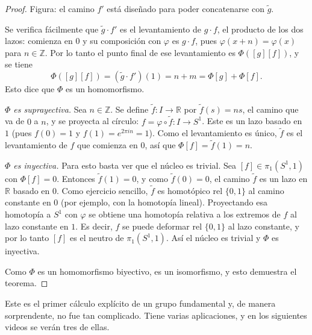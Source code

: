 \documentclass[11pt]{article}
\begin{document}
\begin{proof}
\noindent Figura: el camino $f'$ está diseñado para poder concatenarse con $\tilde g$.

\medskip
Se verifica fácilmente que $\tilde g\cdot f'$ es el levantamiento de $g\cdot f$, el producto de los dos lazos: comienza en $0$ y su composición con $\varphi$ es $g\cdot f$, pues $\varphi(x+n)=\varphi(x)$ para $n\in\mathbb{Z}$. Por lo tanto el punto final de ese levantamiento es $\Phi([g][f])$, y se tiene
\[
  \Phi([g][f])=(\tilde g\cdot f')(1)=n+m=\Phi[g]+\Phi[f].
\]
Esto dice que $\Phi$ es un homomorfismo.

\medskip\noindent\textit{$\Phi$ es suprayectiva.}
Sea $n\in\mathbb{Z}$. Se define $\tilde f\colon I\to\mathbb{R}$ por $\tilde f(s)=ns$, el camino que va de $0$ a $n$, y se proyecta al círculo: $f=\varphi\circ\tilde f\colon I\to S^1$. Este es un lazo basado en $1$ (pues $f(0)=1$ y $f(1)=e^{2\pi i n}=1$). Como el levantamiento es único, $\tilde f$ es el levantamiento de $f$ que comienza en $0$, así que $\Phi[f]=\tilde f(1)=n$.

\medskip\noindent\textit{$\Phi$ es inyectiva.}
Para esto basta ver que el núcleo es trivial. Sea $[f]\in\pi_1(S^1,1)$ con $\Phi[f]=0$. Entonces $\tilde f(1)=0$, y como $\tilde f(0)=0$, el camino $\tilde f$ es un lazo en $\mathbb{R}$ basado en $0$. Como ejercicio sencillo, $\tilde f$ es homotópico rel $\{0,1\}$ al camino constante en $0$ (por ejemplo, con la homotopía lineal). Proyectando esa homotopía a $S^1$ con $\varphi$ se obtiene una homotopía relativa a los extremos de $f$ al lazo constante en $1$. Es decir, $f$ se puede deformar rel $\{0,1\}$ al lazo constante, y por lo tanto $[f]$ es el neutro de $\pi_1(S^1,1)$. Así el núcleo es trivial y $\Phi$ es inyectiva.

Como $\Phi$ es un homomorfismo biyectivo, es un isomorfismo, y esto demuestra el teorema.
\end{proof}

Este es el primer cálculo explícito de un grupo fundamental y, de manera sorprendente, no fue tan complicado. Tiene varias aplicaciones, y en los siguientes videos se verán tres de ellas.
\end{document}
